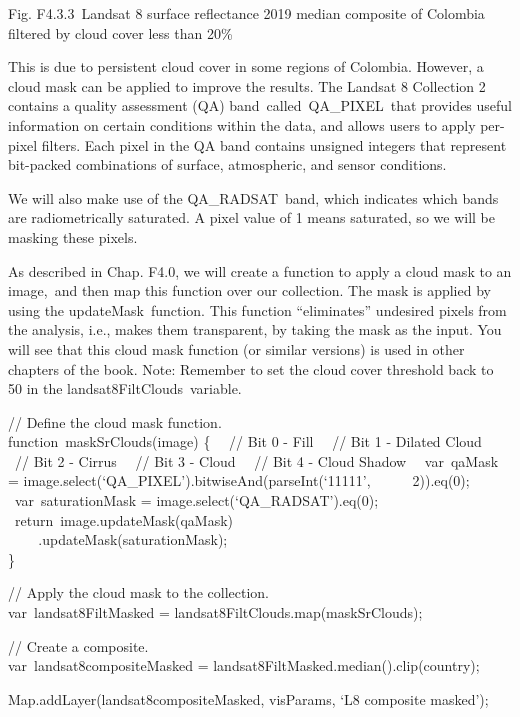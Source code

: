 \documentclass[
  letterpaper,
  DIV=11,
  numbers=noendperiod]{scrreprt}
\begin{document}
Fig. F4.3.3~Landsat 8 surface reflectance 2019 median composite of
Colombia filtered by cloud cover less than 20\%

This is due to persistent cloud cover in some regions of Colombia.
However, a cloud mask can be applied to improve the results. The Landsat
8 Collection 2 contains a quality assessment (QA)
band~called~QA\_PIXEL~that provides useful information on certain
conditions within the data, and allows users to apply per-pixel filters.
Each pixel in the QA band contains unsigned integers that represent
bit-packed combinations of surface, atmospheric, and sensor conditions.

We will also make use of the QA\_RADSAT~band, which indicates which
bands are radiometrically saturated. A pixel value of 1 means saturated,
so we will be masking these pixels.

As described in Chap. F4.0, we will create a function to apply a cloud
mask to an image,~and then map this function over our collection. The
mask is applied by using the updateMask~function. This function
``eliminates'' undesired pixels from the analysis, i.e., makes them
transparent, by taking the mask as the input. You will see that this
cloud mask function (or similar versions) is used in other chapters of
the book. Note: Remember to set the cloud cover threshold back to 50 in
the landsat8FiltClouds~variable.

// Define the cloud mask function.\\
function~maskSrClouds(image) \{~ ~// Bit 0 - Fill~ ~// Bit 1 - Dilated
Cloud~ ~// Bit 2 - Cirrus~ ~// Bit 3 - Cloud~ ~// Bit 4 - Cloud Shadow~
~var~qaMask = image.select(`QA\_PIXEL').bitwiseAnd(parseInt(`11111',~ ~
~ ~2)).eq(0);~ ~var~saturationMask = image.select(`QA\_RADSAT').eq(0);~
~return~image.updateMask(qaMask)\\
\hspace*{0.333em} ~ ~ ~.updateMask(saturationMask);\\
\}

// Apply the cloud mask to the collection.\\
var~landsat8FiltMasked = landsat8FiltClouds.map(maskSrClouds);

// Create a composite.\\
var~landsat8compositeMasked = landsat8FiltMasked.median().clip(country);

Map.addLayer(landsat8compositeMasked, visParams, `L8 composite masked');
\end{document}
